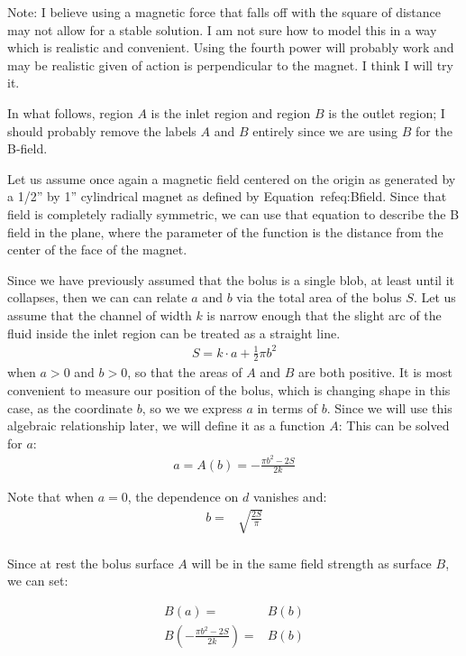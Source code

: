 \documentclass[]{asme2ej}
\begin{document}
Note: I believe using a magnetic force that falls off with the square of distance may
not allow for a stable solution. I am not sure how to model this in a way
which is realistic and convenient. Using the fourth power will probably work and
may be realistic given of action is perpendicular to the magnet. I think I will try it.

In what follows, region $A$ is the inlet region and region $B$ is the
outlet region; I should probably remove the labels $A$ and $B$ entirely
since we are using $B$ for the B-field.

Let us assume once again a magnetic field centered on the origin as generated by a
1/2'' by 1'' cylindrical magnet as defined by Equation~ref{eq:Bfield}.
Since that field is completely radially symmetric, we can use that equation to
describe the B field in the plane, where the parameter of the function
is the distance from the center of the face of the magnet.



Since we have previously assumed that the bolus is a single blob,
at least until it collapses, then we can can relate $a$ and $b$
via the total area of the bolus $S$.
Let us assume that the channel of width $k$ is narrow enough
that the slight arc of the fluid inside the inlet region can be treated as a
straight line.
\begin{align}
S = k \cdot a + \frac{1}{2} \pi b^2
\end{align}
when $a > 0$ and $b > 0$, so that the areas of $A$ and $B$ are both positive.
It is most convenient to measure our position of the bolus, which is
changing shape in this case, as the coordinate $b$, so we we express
$a$ in terms of $b$. Since we will use this algebraic relationship later, we will define it as a function $A$:
This can be solved for $a$:
\begin{align}
  a = A(b) = -\frac{\pi b^2 - 2 S}{2k}
  \label{eqn:afromS}
\end{align}


Note that when $a = 0$, the dependence on $d$ vanishes and:
\begin{align}
  b = & \sqrt{\frac{2S}{\pi}} \\
  \label{eq:maximalB}
\end{align}

Since at rest the bolus surface $A$ will be in the same field strength as surface $B$, we can set:

\begin{align}
  B(a) = & B(b) \\
  B(-\frac{\pi b^2 - 2 S}{2k}) = & B(b)
\end{align}
\end{document}
